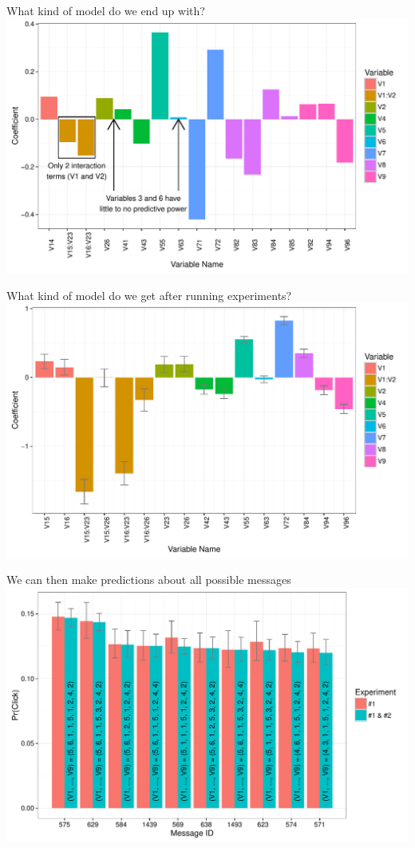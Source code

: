 \documentclass[11pt,xcolor=svgnames]{beamer}
\begin{document}
\begin{frame}
What kind of model do we end up with?
\includegraphics[width=\textwidth]{coef_all.pdf}
\end{frame}

\begin{frame}
What kind of model do we get after running experiments?
\includegraphics[width=\textwidth]{final_model_coefs.pdf}
\end{frame}

\begin{frame}
We can then make predictions about all possible messages
\includegraphics[width=\textwidth]{barplot.pdf}
\end{frame}
\end{document}
